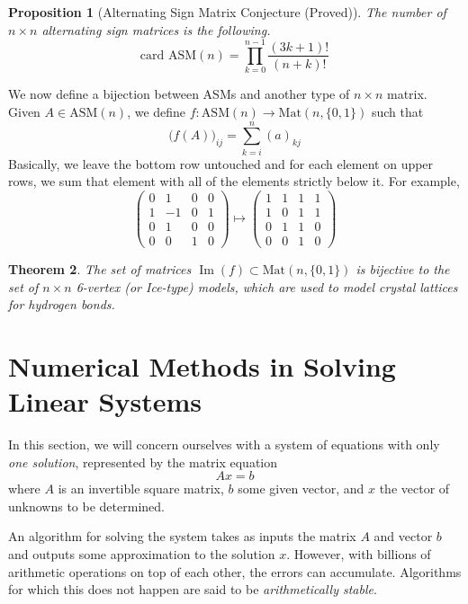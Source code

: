 \documentclass{article}
\DeclareMathOperator{\im}{Im}
\newtheorem{theorem}{Theorem}[section]
\newtheorem{proposition}[theorem]{Proposition}
\theoremstyle{remark}
\theoremstyle{definition}
\begin{document}
\begin{proposition}[Alternating Sign Matrix Conjecture (Proved)]
The number of $n \times n$ alternating sign matrices is the following. 
\[\text{card ASM}(n) = \prod_{k=0}^{n-1} \frac{(3k+1)!}{(n+k)!}\]
\end{proposition}

We now define a bijection between ASMs and another type of $n \times n$ matrix. Given $A \in \text{ASM}(n)$, we define $f: \text{ASM}(n) \longrightarrow \text{Mat}(n, \{0,1\})$ such that
\[\big(f(A)\big)_{ij} = \sum_{k=i}^n (a)_{kj}\]
Basically, we leave the bottom row untouched and for each element on upper rows, we sum that element with all of the elements strictly below it. For example, 
\[\begin{pmatrix}
0&1&0&0\\1&-1&0&1\\0&1&0&0\\0&0&1&0
\end{pmatrix} \mapsto \begin{pmatrix}
1&1&1&1\\1&0&1&1\\0&1&1&0\\0&0&1&0
\end{pmatrix}\]

\begin{theorem}
The set of matrices $\im(f) \subset \text{Mat}(n, \{0, 1\})$ is bijective to the set of $n \times n$ 6-vertex (or Ice-type) models, which are used to model crystal lattices for hydrogen bonds. 
\end{theorem}

\section{Numerical Methods in Solving Linear Systems}
In this section, we will concern ourselves with a system of equations with only \textit{one solution}, represented by the matrix equation
\[A x = b\]
where $A$ is an invertible square matrix, $b$ some given vector, and $x$ the vector of unknowns to be determined. 

An algorithm for solving the system takes as inputs the matrix $A$ and vector $b$ and outputs some approximation to the solution $x$. However, with billions of arithmetic operations on top of each other, the errors can accumulate. Algorithms for which this does not happen are said to be \textit{arithmetically stable}. 
\end{document}
